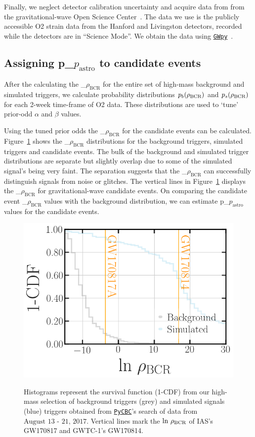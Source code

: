 \documentclass[%
 nofootinbib,
 amsmath,amssymb,
 aps,
 twocolumn
]{revtex4-2}
\newcommand{\gwpy}{{\sc \href{https://gwpy.github.io/}{\texttt{GWpy}}}\xspace}
\newcommand{\pycbc}{{\sc \href{https://pycbc.org/}{\texttt{PyCBC}}}\xspace}
\newcommand{\fancytext}[1]{{\relax\ifmmode#1\else $#1$\fi}\xspace}
\newcommand{\mathcmd}[1]{{\sc \relax\ifmmode#1\else $#1$\fi}\xspace}
\newcommand{\bcr}{\mathcmd{\rho_\text{BCR}}}
\newcommand{\pastro}{\fancytext{p_\text{astro}}}
\begin{document}
Finally, we neglect detector calibration uncertainty and acquire data from from the gravitational-wave Open Science Center~\cite{GWOSC}. The data we use is the publicly accessible O2 strain data from the Hanford and Livingston detectors, recorded while the detectors are in ``Science Mode''. We obtain the data using \gwpy~\cite{gwpy}. 

\subsection{Assigning \pastro to candidate events}
After the calculating the \bcr for the entire set of high-mass background and simulated triggers, we calculate probability distributions $p_b(\bcr)$ and $p_s(\bcr)$ for each 2-week time-frame of O2 data. These distributions are used to `tune' prior-odd $\alpha$ and $\beta$ values.

Using the tuned prior odds the \bcr for the candidate events can be calculated. Figure~\ref{fig:bcrCdf} shows the \bcr distributions for the background triggers, simulated triggers and candidate events. The bulk of the background and simulated trigger distributions are separate but slightly overlap due to some of the simulated signal's being very faint. The separation suggests that the \bcr can successfully distinguish signals from noise or glitches. The vertical lines in Figure~\ref{fig:bcrCdf} displays the \bcr for gravitational-wave candidate events. On comparing the candidate event \bcr values with the background distribution, we can estimate \pastro values for the candidate events. 

\begin{figure}[!ht]
{\centering \includegraphics[width=0.85\linewidth]{images/bcr_cdf_smaller_legend.png} }
\caption[BCR distribution example]{Histograms represent the survival function (1-CDF) from our high-mass selection of background triggers (grey) and simulated signals (blue) triggers obtained from \pycbc's search of data from $\text{August 13 - 21, 2017}$. Vertical lines mark the $\text{ln}\ \bcr$ of IAS's GW170817 and GWTC-1's GW170814.}\label{fig:bcrCdf}
\end{figure}
\end{document}
